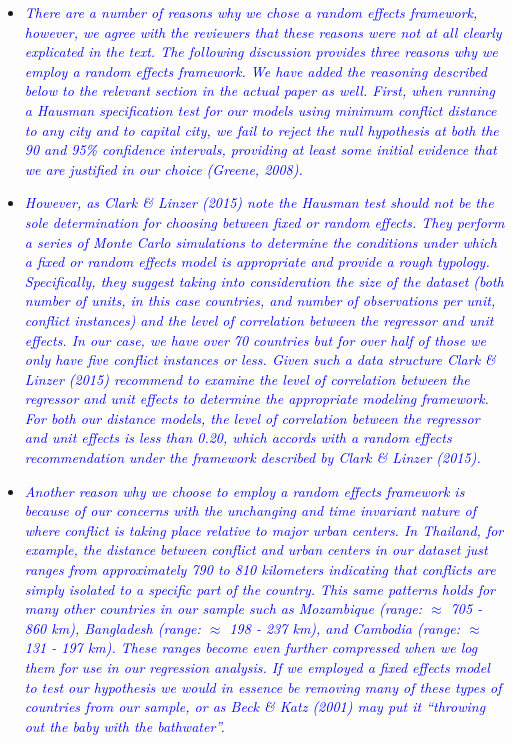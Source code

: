 \begin{enumerate}
\begin{itemize}
\item \textcolor{blue}{\emph{
	There are a number of reasons why we chose a random effects framework, however, we agree with the reviewers that these reasons were not at all clearly explicated in the text. The following discussion provides three reasons why we employ a random effects framework. We have added the reasoning described below to the relevant section in the actual paper as well.
	First, when running a Hausman specification test for our models using minimum conflict distance to any city and to capital city, we fail to reject the null hypothesis at both the 90 and 95\% confidence intervals, providing at least some initial evidence that we are justified in our choice (Greene, 2008).
}}
\item \textcolor{blue}{\emph{
	However, as Clark \& Linzer (2015) note the Hausman test should not be the sole determination for choosing between fixed or random effects. They perform a series of Monte Carlo simulations to determine the conditions under which a fixed or random effects model is appropriate and provide a rough typology. Specifically, they suggest taking into consideration the size of the dataset (both number of units, in this case countries, and number of observations per unit, conflict instances) and the level of correlation between the regressor and unit effects. In our case, we have over 70 countries but for over half of those we only have five conflict instances or less. Given such a data structure Clark \& Linzer (2015) recommend to examine the level of correlation between the regressor and unit effects to determine the appropriate modeling framework. For both our distance models, the level of correlation between the regressor and unit effects is less than 0.20, which accords with a random effects recommendation under the framework described by Clark \& Linzer (2015).
}}
\item \textcolor{blue}{\emph{
	Another reason why we choose to employ a random effects framework is because of our concerns with the unchanging and time invariant nature of where conflict is taking place relative to major urban centers. In Thailand, for example, the distance between conflict and urban centers in our dataset just ranges from approximately 790 to 810 kilometers indicating that conflicts are simply isolated to a specific part of the country. This same patterns holds for many other countries in our sample such as Mozambique (range: $\approx$ 705 - 860 km), Bangladesh (range: $\approx$ 198 - 237 km), and Cambodia (range: $\approx$ 131 - 197 km). These ranges become even further compressed when we log them for use in our regression analysis. If we employed a fixed effects model to test our hypothesis we would in essence be removing many of these types of countries from our sample, or as Beck \& Katz (2001) may put it ``throwing out the baby with the bathwater''. 
}}
\end{itemize}


\end{enumerate}
